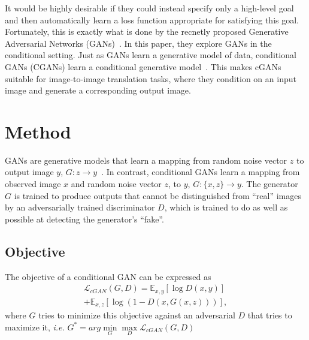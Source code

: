 \documentclass[10pt,twocolumn,letterpaper]{article}
\begin{document}
It would be highly desirable if they could instead specify only a high-level goal and then automatically learn a loss function appropriate for satisfying this goal. Fortunately, this is exactly what is done by the recnetly proposed Generative Adversarial Networks (GANs)~\cite{Generative,Deep,Unsupervised,Improved,Energy}. In this paper, they explore GANs in the conditional setting. Just as GANs learn a generative model of data, conditional GANs (CGANs) learn a conditional generative model~\cite{Generative}. This makes cGANs suitable for image-to-image translation tasks, where they condition on an input image and generate a corresponding output image.

\section{Method}

GANs are generative models that learn a mapping from random noise vector $z$ to output image $y$, $G : z \to y$~\cite{Generative}. In contrast, conditional GANs learn a mapping from observed image $x$ and random noise vector $z$, to $y$, $G : \{x, z\} \to y$. The generator $G$ is trained to produce outputs that cannot be distinguished from ``real'' images by an adversarially trained discriminator $D$, which is trained to do as well as possible at detecting the generator's ``fake''.

\subsection{Objective}

The objective of a conditional GAN can be expressed as\\
\begin{multline}
\mathcal{L}_{cGAN}(G, D) = \mathbb{E}_{x, y}[\log D(x, y)] \\
 + \mathbb{E}_{x, z}[\log(1 - D(x, G(x, z)))],
\end{multline} 
where $G$ tries to minimize this objective against an adversarial $D$ that tries to maximize it, \emph{i.e.} $G^{\ast} = arg\mathop{\min}\limits_{G}\mathop{\max}\limits_D\mathcal{L}_{cGAN}(G, D)$
\end{document}
